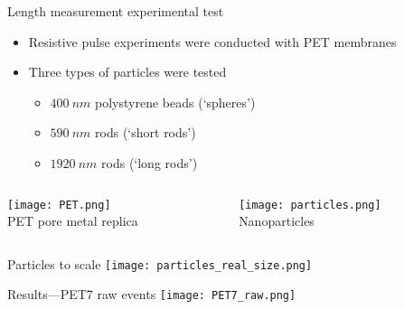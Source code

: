 \begin{frame}[c]{Length measurement experimental test}
	\begin{itemize}
		\item Resistive pulse experiments were conducted with PET membranes
		\item Three types of particles were tested
		\begin{itemize}
			\item $\SI{400}{nm}$ polystyrene beads  (`spheres')
			\item $\SI{590}{nm}$ rods (`short rods')
			\item $\SI{1920}{nm}$ rods (`long rods')
		\end{itemize}
	\end{itemize}
	
	\begin{columns}[t]
		\begin{column}[T]{2.25in}
			{\centering
				\texttt{[image: PET.png]} \\
				PET pore metal replica \\
				\par
			}
		\end{column}
		
		\begin{column}[T]{2.25in}
			{\centering
				\texttt{[image: particles.png]} \\
				Nanoparticles \\
				\par				
			}
		\end{column}

	\end{columns}



\end{frame}




\begin{frame}[c]{Particles to scale}
	\texttt{[image: particles\_real\_size.png]}
\end{frame}





\begin{frame}[c]{Results---PET7 raw events}
	\texttt{[image: PET7\_raw.png]}
\end{frame}